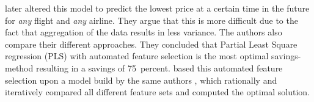 later altered this model to predict the lowest price at a certain time in the future for \emph{any} flight and \emph{any} airline. They argue that this is more difficult due to the fact that aggregation of the data results in less variance.
The authors also compare their different approaches. They concluded that Partial Least Square regression (PLS) with automated feature selection is the most optimal savings-method resulting in a savings of 75~percent.  based this automated feature selection upon a model build by the same authors \cite{groves2011regression}, which rationally and iteratively compared all different feature sets and computed the optimal solution.


